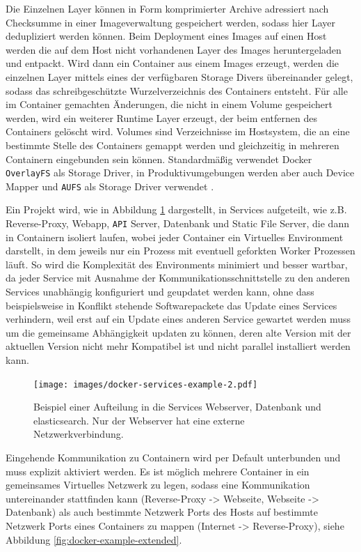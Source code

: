 Die Einzelnen Layer können in Form komprimierter Archive adressiert nach
Checksumme in einer Imageverwaltung gespeichert werden, sodass hier Layer
dedupliziert werden können. Beim Deployment eines Images auf einen Host werden
die auf dem Host nicht vorhandenen Layer des Images heruntergeladen und
entpackt. Wird dann ein Container aus einem Images erzeugt, werden die einzelnen
Layer mittels eines der verfügbaren Storage Divers übereinander gelegt, sodass
das schreibgeschützte Wurzelverzeichnis des Containers entsteht. Für alle im
Container gemachten Änderungen, die nicht in einem Volume gespeichert werden,
wird ein weiterer Runtime Layer erzeugt, der beim entfernen des Containers
gelöscht wird. Volumes sind Verzeichnisse im Hostsystem, die an eine bestimmte
Stelle des Containers gemappt werden und gleichzeitig in mehreren Containern
eingebunden sein können. Standardmäßig verwendet Docker \texttt{OverlayFS} als
Storage Driver, in Produktivumgebungen werden aber auch Device Mapper und
\texttt{AUFS} als Storage Driver verwendet \cite{docker-storage-driver}.

Ein Projekt wird, wie in Abbildung \ref{fig:docker-example-simple} dargestellt,
in Services aufgeteilt, wie z.B. Reverse-Proxy, Webapp, \texttt{API} Server,
Datenbank und Static File Server, die dann in Containern  isoliert laufen, wobei
jeder Container ein Virtuelles Environment darstellt, in dem  jeweils nur ein
Prozess mit eventuell geforkten Worker Prozessen läuft. So wird die Komplexität
des Environments minimiert und besser wartbar, da jeder Service mit Ausnahme der
Kommunikationsschnittstelle zu den anderen Services unabhängig konfiguriert und
geupdatet werden kann, ohne dass beispielsweise in Konflikt stehende
Softwarepackete das Update eines Services verhindern, weil erst auf ein Update
eines anderen Service gewartet werden muss um die gemeinsame Abhängigkeit
updaten zu können, deren alte Version mit der aktuellen Version nicht mehr
Kompatibel ist und nicht parallel installiert werden kann.

\begin{figure}
  \texttt{[image: images/docker-services-example-2.pdf]}

  \caption{Beispiel einer Aufteilung in die Services Webserver, Datenbank und
    elasticsearch. Nur der Webserver hat eine externe Netzwerkverbindung.}
  \label{fig:docker-example-simple}
\end{figure}

Eingehende Kommunikation zu Containern wird per Default unterbunden und muss
explizit aktiviert werden. Es ist möglich mehrere Container in ein
gemeinsames Virtuelles Netzwerk zu legen, sodass eine Kommunikation
untereinander stattfinden kann (Reverse-Proxy -> Webseite, Webseite ->
Datenbank) als auch bestimmte Netzwerk Ports des Hosts auf bestimmte Netzwerk
Ports eines Containers zu mappen (Internet -> Reverse-Proxy), siehe Abbildung
\ref{fig:docker-example-extended}.

